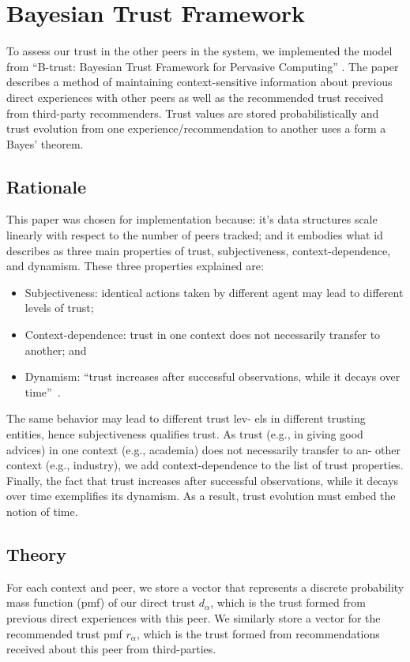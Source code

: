 \section{Bayesian Trust Framework}
To assess our trust in the other peers in the system, we implemented
the model from ``B-trust: Bayesian Trust Framework for Pervasive Computing''
\cite{btrust}. The paper describes a method of maintaining context-sensitive
information about previous direct experiences with other peers as well as
the recommended trust received from third-party recommenders. Trust values
are stored probabilistically and trust evolution from one
experience/recommendation to another uses a form a Bayes' theorem.

\subsection{Rationale}
This paper was chosen for implementation because: it's data structures scale
linearly with respect to the number of peers tracked; and it embodies what
id describes as three main properties of trust, subjectiveness,
context-dependence, and dynamism. These three properties explained are:
\begin{itemize}
  \item Subjectiveness: identical actions taken by different agent may lead to
  different levels of trust;
  \item Context-dependence: trust in one context does not necessarily transfer
  to another; and
  \item Dynamism: ``trust increases after successful observations, while it
  decays over time''~\cite{btrust}.
\end{itemize}

The same behavior may lead to
different trust lev- els in different trusting entities, hence subjectiveness
qualifies trust. As trust (e.g., in giving good advices) in one context (e.g.,
academia) does not necessarily transfer to an- other context (e.g., industry), we
add context-dependence to the list of trust properties. Finally, the fact that
trust increases after successful observations, while it decays over time
exemplifies its dynamism. As a result, trust evolution must embed the notion of
time.



\subsection{Theory}
For each context and peer, we store a vector that represents a discrete
probability mass function (pmf) of our direct trust $d_\alpha$, which is the
trust formed from previous direct experiences with this peer. We similarly store a
vector for the recommended trust pmf $r_\alpha$, which is the trust formed from
recommendations received about this peer from third-parties.

